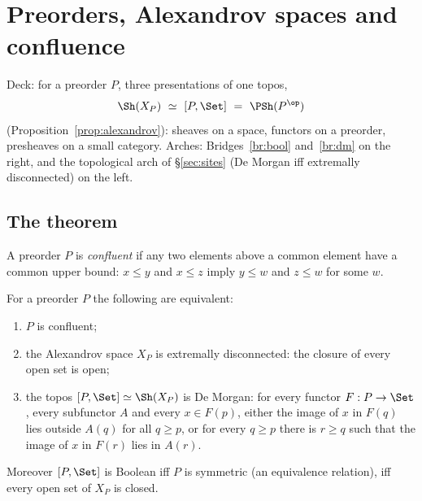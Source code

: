 \section{Preorders, Alexandrov spaces and confluence}\label{sec:preorders}

Deck: for a preorder $P$, three presentations of one topos,
\[
\Sh(X_P)\ \simeq\ [P,\Set]\ =\ \PSh(P^{\op})
\]
(Proposition~\ref{prop:alexandrov}): sheaves on a space, functors on a preorder, presheaves on a small category. Arches: Bridges~\ref{br:bool} and~\ref{br:dm} on the right, and the topological arch of \S\ref{sec:sites} (De Morgan iff extremally disconnected) on the left.

\subsection{The theorem}

\begin{definition}[Confluence]
A preorder $P$ is \emph{confluent} if any two elements above a common element have a common upper bound: $x\le y$ and $x\le z$ imply $y\le w$ and $z\le w$ for some $w$.
\end{definition}

\begin{center}
\end{center}

\begin{theorem}\label{th:confluence}
For a preorder $P$ the following are equivalent:
\begin{enumerate}
\item $P$ is confluent;
\item the Alexandrov space $X_P$ is extremally disconnected: the closure of every open set is open;
\item the topos $[P,\Set]\simeq\Sh(X_P)$ is De Morgan: for every functor $F : P\to\Set$, every subfunctor $A$ and every $x\in F(p)$, either the image of $x$ in $F(q)$ lies outside $A(q)$ for all $q\ge p$, or for every $q\ge p$ there is $r\ge q$ such that the image of $x$ in $F(r)$ lies in $A(r)$.
\end{enumerate}
Moreover $[P,\Set]$ is Boolean iff $P$ is symmetric (an equivalence relation), iff every open set of $X_P$ is closed.
\end{theorem}

